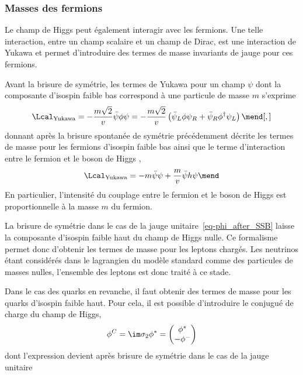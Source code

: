 \subsubsection{Masses des fermions}\label{chapter-MS-MSSM-section-formalisme-subsec-Higgs_mechanism-subsubsec-fermions}
Le champ de Higgs peut également interagir avec les fermions. Une telle interaction, entre un champ scalaire et un champ de Dirac, est une interaction de Yukawa et permet d'introduire des termes de masse invariants de jauge pour ces fermions.
\par Avant la brisure de symétrie, les termes de Yukawa pour un champ $\psi$ dont la composante d'isospin faible bas correspond à une particule de masse $m$ s'exprime
\begin{equation}
\Lcal_\text{Yukawa}
= - \frac{m\sqrt{2}}{v} \bar{\psi} \phi \psi
= - \frac{m\sqrt{2}}{v} \left( \bar{\psi}_L \phi \psi_R + \bar{\psi}_R \phi^\dagger \psi_L \right)
\mend[,]
\end{equation}
donnant après la brisure spontanée de symétrie précédemment décrite les termes de masse pour les fermions d'isospin faible bas
ainsi que le terme d'interaction entre le fermion et le boson de Higgs \higgs,
\begin{equation}
\Lcal_\text{Yukawa} = - m \bar{\psi}\psi + \frac{m}{v} \bar{\psi} h \psi
\mend
\end{equation}
En particulier, l'intensité du couplage entre le fermion et le boson de Higgs est proportionnelle à la masse $m$ du fermion.
\par
La brisure de symétrie dans le cas de la jauge unitaire~\eqref{eq-phi_after_SSB} laisse la composante d'isospin faible haut du champ de Higgs nulle.
Ce formalisme permet donc d'obtenir les termes de masse pour les leptons chargés. Les neutrinos étant considérés dans le lagrangien du modèle standard comme des particules de masses nulles, l'ensemble des leptons est donc traité à ce stade.
\par Dans le cas des quarks en revanche, il faut obtenir des termes de masse pour les quarks d'isospin faible haut. Pour cela, il est possible d'introduire le conjugué de charge du champ de Higgs,
\begin{equation}
\phi^C = \im \sigma_2 \phi^* = \begin{pmatrix}
\phi^* \\ - \phi^-
\end{pmatrix}
\end{equation}
dont l'expression devient après brisure de symétrie dans le cas de la jauge unitaire

